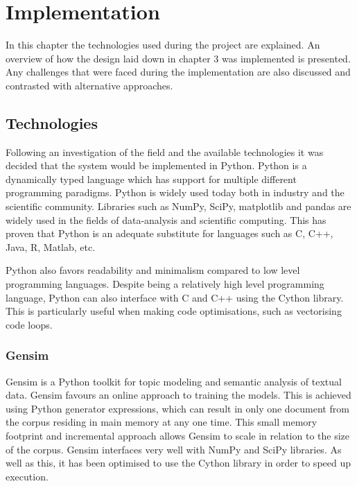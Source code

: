\chapter{Implementation}

In this chapter the technologies used during the project are explained. An overview of how the design laid down in chapter 3 was implemented is presented.
Any challenges that were faced during the implementation are also discussed and contrasted with alternative approaches.

\section{Technologies}
Following an investigation of the field and the available technologies it was decided that the system would be implemented in Python.
Python is a dynamically typed language which has support for multiple different programming paradigms.
Python is widely used today both in industry and the scientific community.
Libraries such as NumPy, SciPy, matplotlib and pandas are widely used in the fields of data-analysis and scientific computing.
This has proven that Python is an adequate substitute for languages such as C, C++, Java, R, Matlab, etc.

Python also favors readability and minimalism compared to low level programming languages.
Despite being a relatively high level programming language, Python can also interface with C and C++ using the Cython library.
This is particularly useful when making code optimisations, such as vectorising code loops.

\subsection{Gensim}
Gensim is a Python toolkit for topic modeling and semantic analysis of textual data.
Gensim favours an online approach to training the models.
This is achieved using Python generator expressions, which can result in only one document from the corpus residing in main memory at any one time.
This small memory footprint and incremental approach allows Gensim to scale in relation to the size of the corpus.
Gensim interfaces very well with NumPy and SciPy libraries.
As well as this, it has been optimised to use the Cython library in order to speed up execution.


